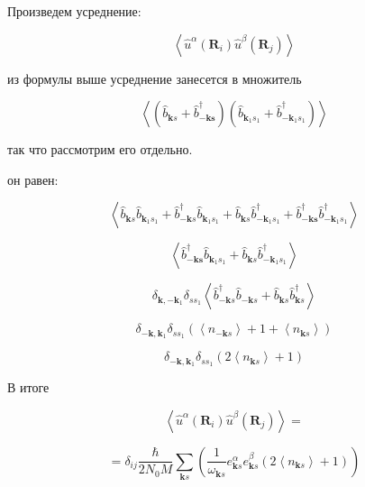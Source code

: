 \documentclass[a4paper,12pt]{article} %
\begin{document}
\begin{task}
Произведем усреднение:



$$
\left\langle\widehat{u}^{\alpha}\left(\boldsymbol{R}_{i}\right) 
\hat{u}^{\beta}\left(\boldsymbol{R}_{j}\right)\right\rangle
$$

из формулы выше усреднение занесется в множитель


$$
\left\langle\left(\hat{b}_{\boldsymbol{k} s}+\hat{b}_{-\boldsymbol{k s}}^{\dagger}\right)\left(\hat{b}_{\boldsymbol{k}_{1} s_{1}}+\hat{b}_{-\boldsymbol{k}_{1} s_{1}}^{\dagger}\right)\right\rangle
$$




так что рассмотрим его отдельно.

он равен:




$$
\left\langle\hat{b}_{\boldsymbol{k} s} \hat{b}_{\boldsymbol{k}_{1} s_{1}}+\hat{b}_{-\boldsymbol{k} s}^{\dagger} \hat{b}_{\boldsymbol{k}_{1} s_{1}}+\hat{b}_{\boldsymbol{k} s} \hat{b}_{-\boldsymbol{k}_{1} s_{1}}^{\dagger}+\hat{b}_{-\boldsymbol{k s}}^{\dagger} \hat{b}_{-\boldsymbol{k}_{1} s_{1}}^{\dagger}\right\rangle
$$


$$
\left\langle\widehat{b}_{-\boldsymbol{k s}}^{\dagger} \hat{b}_{\boldsymbol{k}_{1} s_{1}}+\widehat{b}_{\boldsymbol{k} s} \hat{b}_{-\boldsymbol{k}_{1} s_{1}}^{\dagger}\right\rangle
$$



$$
\delta_{\boldsymbol{k},-\boldsymbol{k}_{1}} \delta_{s s_{1}}\left\langle\hat{b}_{-\boldsymbol{k} s}^{\dagger} \hat{b}_{-\boldsymbol{k} s}+\widehat{b}_{\boldsymbol{k} s} \hat{b}_{\boldsymbol{k} s}^{\dagger}\right\rangle
$$


$$
\delta_{-\boldsymbol{k}, \boldsymbol{k}_{1}} \delta_{s s_{1}}\left(\left\langle n_{-\boldsymbol{k} s}\right\rangle+1+\left\langle n_{\boldsymbol{k} s}\right\rangle\right)
$$

$$
\delta_{-\boldsymbol{k}, \boldsymbol{k}_{1}} \delta_{s s_{1}}\left(2\left\langle n_{\boldsymbol{k} s}\right\rangle+1\right)
$$



В итоге


$$
\left\langle\widehat{u}^{\alpha}\left(\boldsymbol{R}_{i}\right) 
\hat{u}^{\beta}\left(\boldsymbol{R}_{j}\right)\right\rangle =
$$


$$
=\delta_{i j} \frac{\hbar}{2 N_{0} M} \sum_{\boldsymbol{k} s}\left(\frac{1}{\omega_{\boldsymbol{k} s}} e_{\boldsymbol{k} s}^{\alpha} e_{\boldsymbol{k} s}^{\beta}\left(2\left\langle n_{\boldsymbol{k} s}\right\rangle+1\right)\right)
$$



\end{task}
\end{document}
